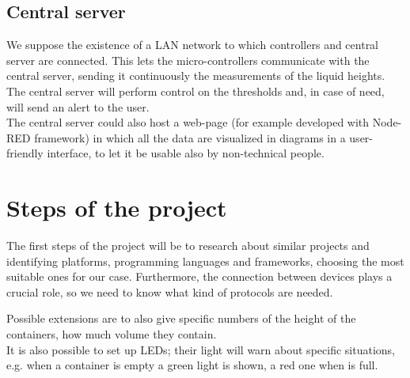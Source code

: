 \documentclass{article}
\begin{document}
\subsection{Central server}

We suppose the existence of a LAN network to which controllers and central
server are connected. This lets the micro-controllers communicate with the
central server, sending it continuously the measurements of the liquid
heights. \\

The central server will perform control on the thresholds and, in case of need,
will send an alert to the user. \\ 

The central server could also host a web-page (for example developed with
Node-RED framework) in which all the data are visualized in diagrams in a
user-friendly interface, to let it be usable also by non-technical people. \\


\section{Steps of the project}

The first steps of the project will be to research about similar projects and
identifying platforms, programming languages and frameworks, choosing
the most suitable ones for our case.
Furthermore, the connection between devices
plays a crucial role, so we need to know what kind of protocols are needed. \par

Possible extensions are to also give specific numbers of the height of the
containers, how much volume they contain. \\

It is also possible to set up LEDs; their light will warn about specific
situations, e.g. when a container is empty a green light is shown, a red one when
is full.

\end{document}
